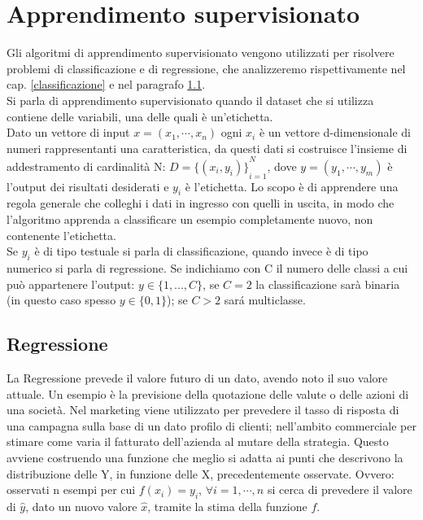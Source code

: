 \documentclass[a4paper,12pt,oneside]{book}
\begin{document}
\section{Apprendimento supervisionato}
Gli algoritmi di apprendimento supervisionato vengono utilizzati per risolvere problemi di classificazione e di regressione, che analizzeremo rispettivamente nel cap. \ref{classificazione} e nel paragrafo \ref{regressione}.\\
Si parla di apprendimento supervisionato quando il dataset che si utilizza contiene delle variabili, una delle quali \`e un'etichetta.\\
Dato un vettore di input $x=(x_{1},\cdots,x_{n})$ ogni $x_{i}$ \`e un vettore d-dimensionale di numeri rappresentanti una caratteristica, da questi dati si costruisce l'insieme di addestramento di cardinalit\`{a} N: $D={\{ (x_{i},y_{i})\}}^{N}_{i=1}$, dove $y=(y_{1},\cdots,y_{m})$ \`e l'output dei risultati desiderati e $y_{i}$ \`e l'etichetta.
Lo scopo \`e di apprendere una regola generale che colleghi i dati in ingresso con quelli in uscita, in modo che l'algoritmo apprenda a classificare un esempio completamente nuovo, non contenente l'etichetta.\\
Se $y_{i}$ \`e di tipo testuale si parla di classificazione, quando invece \`e di tipo numerico si parla di regressione. Se indichiamo con C il numero delle classi a cui pu\`{o} appartenere l'output: $y\in \{1,...,C\}$, se $C=2$ la classificazione sar\`{a} binaria (in questo caso spesso $y\in \{0,1\}$); se $C>2$ sar\'{a} multiclasse.\\

\subsection{Regressione}\label{regressione}
La Regressione prevede il valore futuro di un dato, avendo noto il suo valore attuale. Un esempio \`e la previsione della quotazione delle valute o delle azioni di una societ\`{a}. Nel marketing viene utilizzato per prevedere il tasso di risposta di una campagna sulla base di un dato profilo di clienti; nell'ambito commerciale per stimare come varia il fatturato dell'azienda al mutare della strategia. Questo avviene costruendo una funzione che meglio si adatta ai punti che descrivono la distribuzione delle Y, in funzione delle X, precedentemente osservate. Ovvero: osservati n esempi per cui $f(x_i)=y_i$, $\forall i=1,\cdots ,n$ si cerca di prevedere il valore di $\hat{y}$, dato un nuovo valore $\hat{x}$, tramite la stima della funzione $f$.
\end{document}

